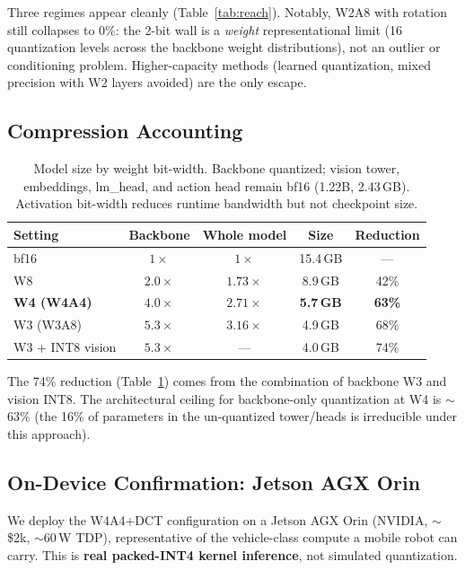 \documentclass[conference]{IEEEtran}
\begin{document}
Three regimes appear cleanly (Table~\ref{tab:reach}). Notably, W2A8 with rotation still
collapses to 0\%: the 2-bit wall is a \emph{weight} representational limit (16 quantization
levels across the backbone weight distributions), not an outlier or conditioning problem.
Higher-capacity methods (learned quantization, mixed precision with W2 layers avoided)
are the only escape.

\subsection{Compression Accounting}
\label{sec:size}

\begin{table}[h]\centering\small
\caption{Model size by weight bit-width. Backbone quantized; vision tower, embeddings, lm\_head,
and action head remain bf16 (1.22B, 2.43\,GB). Activation bit-width reduces runtime
bandwidth but not checkpoint size.}
\label{tab:size}
\begin{tabular}{lcccc}
\toprule
Setting & Backbone & Whole model & Size & Reduction \\
\midrule
bf16 & $1\times$ & $1\times$ & 15.4\,GB & --- \\
W8   & $2.0\times$ & $1.73\times$ & 8.9\,GB & 42\% \\
\textbf{W4 (W4A4)} & $\mathbf{4.0\times}$ & $\mathbf{2.71\times}$ & \textbf{5.7\,GB} & \textbf{63\%} \\
W3 (W3A8) & $5.3\times$ & $3.16\times$ & 4.9\,GB & 68\% \\
W3 + INT8 vision & $5.3\times$ & --- & 4.0\,GB & 74\% \\
\bottomrule
\end{tabular}
\end{table}

The 74\% reduction (Table~\ref{tab:size}) comes from the combination of backbone W3 and vision
INT8. The architectural ceiling for backbone-only quantization at W4 is $\sim$63\% (the 16\%
of parameters in the un-quantized tower/heads is irreducible under this approach).

\subsection{On-Device Confirmation: Jetson AGX Orin}
\label{sec:device}

We deploy the W4A4+DCT configuration on a Jetson AGX Orin (NVIDIA, $\sim$\$2k, $\sim$60\,W
TDP), representative of the vehicle-class compute a mobile robot can carry. This is
\textbf{real packed-INT4 kernel inference}, not simulated quantization.
\end{document}
